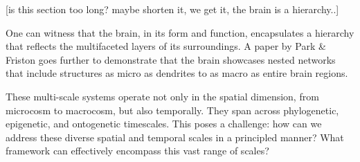 


[is this section too long? maybe shorten it, we get it, the brain is a hierarchy..]
 



\cite{Park_Friston_2013}
One can witness that the brain, in its form and function, encapsulates a hierarchy that reflects the multifaceted layers of its surroundings. A paper by Park \& Friston goes further to demonstrate that the brain showcases nested networks that include structures as micro as dendrites to as macro as entire brain regions.

These multi-scale systems operate not only in the spatial dimension, from microcosm to macrocosm, but also temporally. They span across phylogenetic, epigenetic, and ontogenetic timescales. This poses a challenge: how can we address these diverse spatial and temporal scales in a principled manner? What framework can effectively encompass this vast range of scales?

